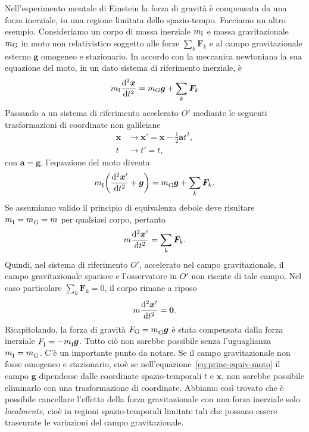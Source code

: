 Nell'esperimento mentale di Einstein la forza di gravità è compensata da una
forza inerziale, in una regione limitata dello spazio-tempo.  Facciamo un altro
esempio.  Consideriamo un corpo di massa inerziale $m_{\textup{I}}$ e massa
gravitazionale $m_{\textup{G}}$ in moto non relativistico soggetto alle forze
$\sum_{k} \bm{F}_{k}$ e al campo gravitazionale esterno $\bm{g}$ omogeneo e
stazionario.  In accordo con la meccanica newtoniana la sua equazione del moto,
in un dato sistema di riferimento inerziale, è
\begin{equation}
  \label{eq:princ-equiv-moto}
  m_{\textup{I}}\toder[2]{\bm{x}}{t} = m_{\textup{G}}\bm{g}+\sum_{k} \bm{F}_{k}
\end{equation}
Passando a un sistema di riferimento accelerato $O'$ mediante le seguenti
trasformazioni di coordinate non galileiane
\begin{subequations}
  \begin{align}
    \bm{x} &\to \bm{x}'=\bm{x}-{\frac{1}{2}}\bm{a}{t^{2}}, \\
    t &\to t' =t,
  \end{align}
\end{subequations}
con $\bm{a}=\bm{g}$, l'equazione del moto diventa
\begin{equation}
  m_{\textup{I}}^{}\bigg(\toder[2]{\bm{x}'}{t}+\bm{g}\bigg) =
  m_{\textup{G}}^{}\bm{g}+\sum_{k} \bm{F}_{k}.
\end{equation}
Se assumiamo valido il principio di equivalenza debole deve risultare
$m_{\textup{I}}^{}=m_{\textup{G}}^{}=m$ per qualsiasi corpo, pertanto
\begin{equation}
  m\toder[2]{\bm{x}'}{t} = \sum_{k} \bm{F}_{k}.
\end{equation}
Quindi, nel sistema di riferimento $O'$, accelerato nel campo gravitazionale, il
campo gravitazionale sparisce e l'osservatore in $O'$ non risente di tale campo.
Nel caso particolare $\sum_{k} \bm{F}_{k} = 0$, il corpo rimane a riposo
\begin{equation}
  m\toder[2]{\bm{x}'}{t} = \bm{0}.
\end{equation}
Ricapitolando, la forza di gravità $F_{\textup{G}} = m_{\textup{G}}^{}\bm{g}$ è
stata compensata dalla forza inerziale
$F_{\textup{I}}^{}=-m_{\textup{I}}^{}\bm{g}$.  Tutto ciò non sarebbe possibile
senza l'uguaglianza $m_{\textup{I}}^{}=m_{\textup{G}}^{}$.  C'è un importante
punto da notare.  Se il campo gravitazionale non fosse omogeneo e stazionario,
cioè se nell'equazione~\eqref{eq:princ-equiv-moto} il campo $\bm{g}$ dipendesse
dalle coordinate spazio-temporali $t$ e $\bm{x}$, non sarebbe possibile
eliminarlo con una trasformazione di coordinate.  Abbiamo così trovato che è
possibile cancellare l'effetto della forza gravitazionale con una forza
inerziale solo \emph{localmente}, cioè in regioni spazio-temporali limitate tali
che possano essere trascurate le variazioni del campo gravitazionale.

